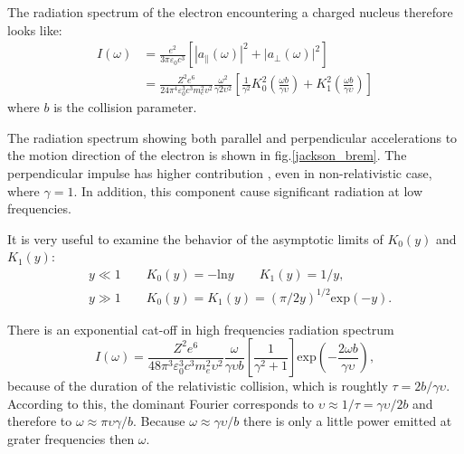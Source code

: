 \documentclass[oneside,a4paper,11pt]{report}
\begin{document}
The radiation spectrum of the electron encountering a charged nucleus therefore looks like: 
\begin{equation}
 \label{rad_spec_brem}
\begin{split}
I(\omega) &= \frac{e^2}{3\pi \varepsilon_0 c^3}\left [ \left | a_\parallel (\omega) \right |^2 + \left | a_\perp (\omega) \right |^2 \right ] \\
&= \frac{Z^2e^6}{24\pi^4 \varepsilon_0^3 c^3 m_e^2 v^2} \frac{\omega^2}{\gamma2 \upsilon^2}\left [ \frac{1}{\gamma^2}K_0^2\left ( \frac{\omega b}{\gamma \upsilon} \right ) + K_1^2 \left ( \frac{\omega b}{\gamma \upsilon} \right ) \right ] 
\end{split}
\end{equation}
where $b$ is the collision parameter. 

The radiation spectrum showing both parallel and perpendicular accelerations to the motion 
direction of the electron is shown in fig.\ref{jackson_brem}. The perpendicular impulse 
has higher contribution , even in non-relativistic case, where $\gamma = 1$.  In addition, 
this component cause significant radiation at low frequencies.   

It is very useful to examine the behavior of the asymptotic limits of $K_0(y)$ and $K_1(y)$: 
\begin{equation}
 \label{examine_k}
\begin{split}
&y \ll 1 \qquad K_0(y) = -\mathrm{ln} y \qquad K_1(y) = 1/y , \\
&y \gg 1 \qquad  K_0(y) =  K_1(y) = (\pi/2y)^{1/2} \mathrm{exp}(-y).    
\end{split}
\end{equation}

There is an exponential cat-off in high frequencies radiation spectrum
\begin{equation}
\label{high_f}
I(\omega) = \frac{Z^2 e^6}{48 \pi^3 \varepsilon_0^3 c^3 m_e^2 \upsilon^2 } \frac{\omega}{\gamma \upsilon b} \left [ \frac{1}{\gamma^2 +1} \right ] \mathrm{exp}\left ( - \frac{2 \omega b}{\gamma \upsilon} \right ), 
\end{equation}
because of the duration of the relativistic collision, 
which is roughtly $\tau = 2b / \gamma \upsilon$. According to this, the dominant Fourier corresponds to 
$\upsilon \approx 1/ \tau = \gamma \upsilon / 2b$ and therefore to $\omega \approx \pi \upsilon \gamma / b$. 
Because $\omega \approx \gamma \upsilon / b$ there is only a little power emitted at grater frequencies 
then $\omega$. 
\end{document}
